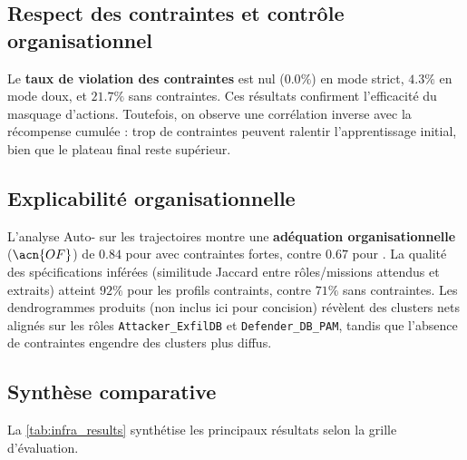\subsection*{Respect des contraintes et contrôle organisationnel}

Le \textbf{taux de violation des contraintes} est nul ($0.0\%$) en mode strict, $4.3\%$ en mode doux, et $21.7\%$ sans contraintes.
Ces résultats confirment l'efficacité du masquage d'actions.
Toutefois, on observe une corrélation inverse avec la récompense cumulée : trop de contraintes peuvent ralentir l'apprentissage initial, bien que le plateau final reste supérieur.

\subsection*{Explicabilité organisationnelle}

L'analyse Auto- sur les trajectoires montre une \textbf{adéquation organisationnelle} ($\acn{OF}$) de $0.84$ pour  avec contraintes fortes, contre $0.67$ pour .
La qualité des spécifications inférées (similitude Jaccard entre rôles/missions attendus et extraits) atteint $92\%$ pour les profils contraints, contre $71\%$ sans contraintes.
Les dendrogrammes produits (non inclus ici pour concision) révèlent des clusters nets alignés sur les rôles \texttt{Attacker\_ExfilDB} et \texttt{Defender\_DB\_PAM}, tandis que l'absence de contraintes engendre des clusters plus diffus.

\subsection*{Synthèse comparative}

La \autoref{tab:infra_results} synthétise les principaux résultats selon la grille d'évaluation.

